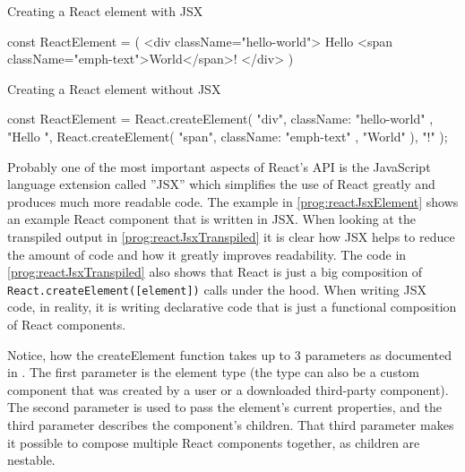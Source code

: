 \begin{program}
\caption{Creating a React element with JSX} 
\label{prog:reactJsxElement}
\begin{JsCode}
const ReactElement = (
  <div className="hello-world">
    Hello <span className="emph-text">World</span>!
  </div>
)
\end{JsCode}
\end{program}

\begin{program}
\caption{Creating a React element without JSX} 
\label{prog:reactJsxTranspiled}
\begin{JsCode}
const ReactElement = React.createElement(
  "div", 
  { className: "hello-world" }, 
  "Hello ", 
  React.createElement(
    "span", 
    { className: "emph-text" }, 
    "World"
  ), 
  "!"
);
\end{JsCode}
\end{program}

Probably one of the most important aspects of React's API is the JavaScript language extension called ''JSX'' which simplifies the use of React greatly and produces much more readable code. The example in \ref{prog:reactJsxElement} shows an example React component that is written in JSX. When looking at the transpiled output in \ref{prog:reactJsxTranspiled} it is clear how JSX helps to reduce the amount of code and how it greatly improves readability. The code in \ref{prog:reactJsxTranspiled} also shows that React is just a big composition of \texttt{React.createElement([element])} calls under the hood. When writing JSX code, in reality, it is writing declarative code that is just a functional composition of React components. 

Notice, how the createElement function takes up to 3 parameters as documented in \cite[/docs/react-api.html]{React}. The first parameter is the element type (the type can also be a custom component that was created by a user or a downloaded third-party component). The second parameter is used to pass the element's current properties, and the third parameter describes the component's children. That third parameter makes it possible to compose multiple React components together, as children are nestable. 

